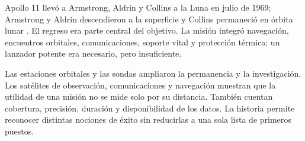 Apollo 11 llevó a Armstrong, Aldrin y Collins a la Luna en julio de 1969; Armstrong y Aldrin descendieron a la superficie y Collins permaneció en órbita lunar \cite{NASA-HISTORY}. El regreso era parte central del objetivo. La misión integró navegación, encuentros orbitales, comunicaciones, soporte vital y protección térmica; un lanzador potente era necesario, pero insuficiente.

Las estaciones orbitales y las sondas ampliaron la permanencia y la investigación. Los satélites de observación, comunicaciones y navegación muestran que la utilidad de una misión no se mide solo por su distancia. También cuentan cobertura, precisión, duración y disponibilidad de los datos. La historia permite reconocer distintas nociones de éxito sin reducirlas a una sola lista de primeros puestos.


